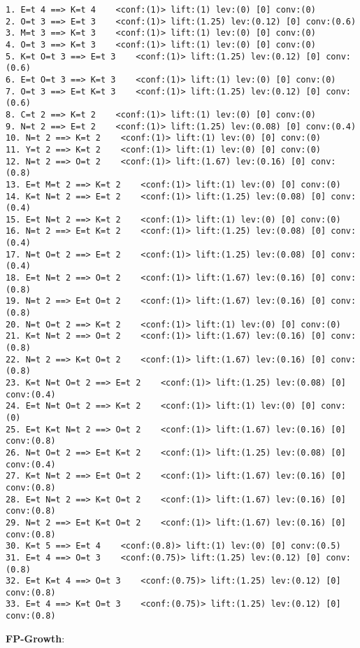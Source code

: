 \documentclass[12pt]{elsart}
\begin{document}
\begin{verbatim}
1. E=t 4 ==> K=t 4    <conf:(1)> lift:(1) lev:(0) [0] conv:(0)
2. O=t 3 ==> E=t 3    <conf:(1)> lift:(1.25) lev:(0.12) [0] conv:(0.6)
3. M=t 3 ==> K=t 3    <conf:(1)> lift:(1) lev:(0) [0] conv:(0)
4. O=t 3 ==> K=t 3    <conf:(1)> lift:(1) lev:(0) [0] conv:(0)
5. K=t O=t 3 ==> E=t 3    <conf:(1)> lift:(1.25) lev:(0.12) [0] conv:(0.6)
6. E=t O=t 3 ==> K=t 3    <conf:(1)> lift:(1) lev:(0) [0] conv:(0)
7. O=t 3 ==> E=t K=t 3    <conf:(1)> lift:(1.25) lev:(0.12) [0] conv:(0.6)
8. C=t 2 ==> K=t 2    <conf:(1)> lift:(1) lev:(0) [0] conv:(0)
9. N=t 2 ==> E=t 2    <conf:(1)> lift:(1.25) lev:(0.08) [0] conv:(0.4)
10. N=t 2 ==> K=t 2    <conf:(1)> lift:(1) lev:(0) [0] conv:(0)
11. Y=t 2 ==> K=t 2    <conf:(1)> lift:(1) lev:(0) [0] conv:(0)
12. N=t 2 ==> O=t 2    <conf:(1)> lift:(1.67) lev:(0.16) [0] conv:(0.8)
13. E=t M=t 2 ==> K=t 2    <conf:(1)> lift:(1) lev:(0) [0] conv:(0)
14. K=t N=t 2 ==> E=t 2    <conf:(1)> lift:(1.25) lev:(0.08) [0] conv:(0.4)
15. E=t N=t 2 ==> K=t 2    <conf:(1)> lift:(1) lev:(0) [0] conv:(0)
16. N=t 2 ==> E=t K=t 2    <conf:(1)> lift:(1.25) lev:(0.08) [0] conv:(0.4)
17. N=t O=t 2 ==> E=t 2    <conf:(1)> lift:(1.25) lev:(0.08) [0] conv:(0.4)
18. E=t N=t 2 ==> O=t 2    <conf:(1)> lift:(1.67) lev:(0.16) [0] conv:(0.8)
19. N=t 2 ==> E=t O=t 2    <conf:(1)> lift:(1.67) lev:(0.16) [0] conv:(0.8)
20. N=t O=t 2 ==> K=t 2    <conf:(1)> lift:(1) lev:(0) [0] conv:(0)
21. K=t N=t 2 ==> O=t 2    <conf:(1)> lift:(1.67) lev:(0.16) [0] conv:(0.8)
22. N=t 2 ==> K=t O=t 2    <conf:(1)> lift:(1.67) lev:(0.16) [0] conv:(0.8)
23. K=t N=t O=t 2 ==> E=t 2    <conf:(1)> lift:(1.25) lev:(0.08) [0] conv:(0.4)
24. E=t N=t O=t 2 ==> K=t 2    <conf:(1)> lift:(1) lev:(0) [0] conv:(0)
25. E=t K=t N=t 2 ==> O=t 2    <conf:(1)> lift:(1.67) lev:(0.16) [0] conv:(0.8)
26. N=t O=t 2 ==> E=t K=t 2    <conf:(1)> lift:(1.25) lev:(0.08) [0] conv:(0.4)
27. K=t N=t 2 ==> E=t O=t 2    <conf:(1)> lift:(1.67) lev:(0.16) [0] conv:(0.8)
28. E=t N=t 2 ==> K=t O=t 2    <conf:(1)> lift:(1.67) lev:(0.16) [0] conv:(0.8)
29. N=t 2 ==> E=t K=t O=t 2    <conf:(1)> lift:(1.67) lev:(0.16) [0] conv:(0.8)
30. K=t 5 ==> E=t 4    <conf:(0.8)> lift:(1) lev:(0) [0] conv:(0.5)
31. E=t 4 ==> O=t 3    <conf:(0.75)> lift:(1.25) lev:(0.12) [0] conv:(0.8)
32. E=t K=t 4 ==> O=t 3    <conf:(0.75)> lift:(1.25) lev:(0.12) [0] conv:(0.8)
33. E=t 4 ==> K=t O=t 3    <conf:(0.75)> lift:(1.25) lev:(0.12) [0] conv:(0.8)
\end{verbatim}

{\bf FP-Growth}:
\end{document}
